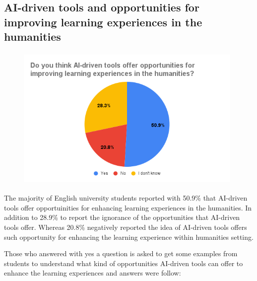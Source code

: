 \subsection{AI-driven tools and opportunities for improving learning experiences in the humanities }
\begin{figure}[H]
	\centering
	\includegraphics[width=11cm, height=7cm]{./chap4/figures/op.png}
\end{figure}

The majority of English university students reported with 50.9\% that AI-driven tools offer opportuinities
for enhancing learning experiences in the humanities. In addition to 28.9\% to report the
ignorance of the opportunities that AI-driven tools offer. Whereas 20.8\% negatively reported
the idea of AI-driven tools offers such opportunity for enhancing the learning experience
within humanities setting.


Those who answered with yes a question is asked to get some examples from students
to understand what kind of opportunities AI-driven tools can offer to enhance the learning experiences and answers were follow:


